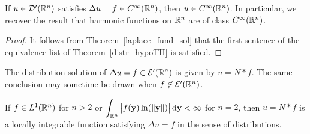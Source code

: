 \begin{cor} \label{lapl_anal_cond}
If $u\in \mathcal{D}'(\mathbb{R}^n)$ satisfies $\Delta u = f \in C^\infty(\mathbb{R}^n)$,
then $u \in C^\infty(\mathbb{R}^n)$.  In particular, we recover the
result that harmonic functions on $\mathbb{R}^n$ are of class $C^\infty(\mathbb{R}^n)$.
\end{cor}

\begin{proof}
It follows from Theorem~\ref{laplace_fund_sol} that
the first sentence of the equivalence list of Theorem~\ref{distr_hypoTH} is
satisfied.
\end{proof}

The distribution solution of $\Delta u = f \in \mathcal{E}'(\mathbb{R}^n)$ is given
by $u = N \ast f$.  The same conclusion may sometime be drawn when
$f \not\in \mathcal{E}'(\mathbb{R}^n)$.

\begin{theorem} \label{laplace_not_EEp}
If $f \in L^1(\mathbb{R}^n)$ for $n>2$ or
$\displaystyle \int_{\mathbb{R}^n} \big|f(\mathbf{y}) \ln(\|\mathbf{y}\|)\big|
\,\mathrm{d}{\mathbf{y}}<\infty$ for $n=2$, then $u= N\ast f$ is a locally
integrable function satisfying $\Delta u = f$ in the sense of
distributions.
\end{theorem}

